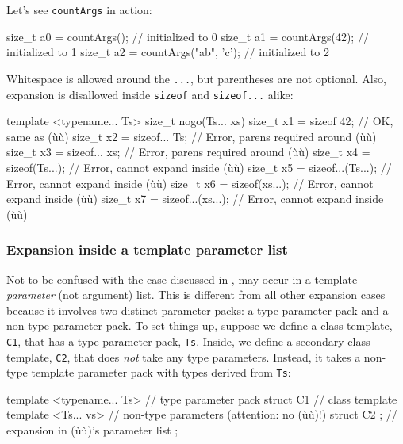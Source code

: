 \noindent Let's see \lstinline!countArgs! in action:

\begin{emcppslisting}
size_t a0 = countArgs();           // initialized to 0
size_t a1 = countArgs(42);         // initialized to 1
size_t a2 = countArgs("ab", 'c');  // initialized to 2
\end{emcppslisting}
    

\noindent Whitespace is allowed around the \lstinline!...!, but parentheses are not
optional. Also, expansion is disallowed inside \lstinline!sizeof! and
\lstinline!sizeof...! alike:

\begin{emcppslisting}
template <typename... Ts>
size_t nogo(Ts... xs)
{
    size_t x1 = sizeof 42;         // OK, same as (ù{}ù)
    size_t x2 = sizeof... Ts;      // Error, parens required around (ù{}ù)
    size_t x3 = sizeof... xs;      // Error, parens required around (ù{}ù)
    size_t x4 = sizeof(Ts...);     // Error, cannot expand inside (ù{}ù)
    size_t x5 = sizeof...(Ts...);  // Error, cannot expand inside (ù{}ù)
    size_t x6 = sizeof(xs...);     // Error, cannot expand inside (ù{}ù)
    size_t x7 = sizeof...(xs...);  // Error, cannot expand inside (ù{}ù)
}
\end{emcppslisting}
    

\subsubsection[Expansion inside a template parameter list]{Expansion inside a template parameter list}\label{expansion-inside-a-template-parameter-list}

Not to be confused with the case discussed in ,  may occur in a
template \emph{parameter} (not argument) list. This is different from
all other expansion cases because it involves two distinct parameter
packs: a type parameter pack and a non-type parameter pack. To set
things up, suppose we define a class template, \lstinline!C1!, that has a
type parameter pack, \lstinline!Ts!. Inside, we define a secondary class
template, \lstinline!C2!, that does \emph{not} take any type parameters.
Instead, it takes a non-type template parameter pack with types derived
from \lstinline!Ts!:

\begin{emcppslisting}
template <typename... Ts>  // type parameter pack
struct C1                  // class template
{
    template <Ts... vs>    // non-type parameters (attention: no (ù{}ù)!)
    struct C2 { };         // expansion in (ù{}ù)'s parameter list
};
\end{emcppslisting}
    

